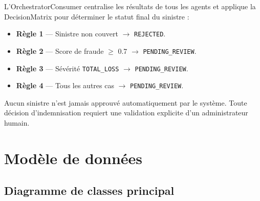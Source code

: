 L'OrchestratorConsumer centralise les résultats de tous les agents et applique
la DecisionMatrix pour déterminer le statut final du sinistre :

\begin{itemize}
  \item \textbf{Règle 1} — Sinistre non couvert $\rightarrow$ \texttt{REJECTED}.
  \item \textbf{Règle 2} — Score de fraude $\geq$ 0.7 $\rightarrow$ \texttt{PENDING\_REVIEW}.
  \item \textbf{Règle 3} — Sévérité \texttt{TOTAL\_LOSS} $\rightarrow$ \texttt{PENDING\_REVIEW}.
  \item \textbf{Règle 4} — Tous les autres cas $\rightarrow$ \texttt{PENDING\_REVIEW}.
\end{itemize}

\begin{infobox}
Aucun sinistre n'est jamais approuvé automatiquement par le système.
Toute décision d'indemnisation requiert une validation explicite d'un administrateur humain.
\end{infobox}

\section{Modèle de données}

\subsection{Diagramme de classes principal}

